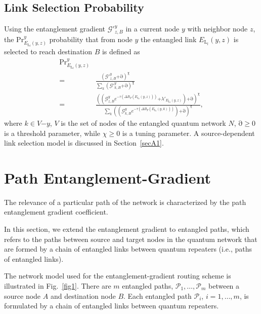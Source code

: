 \documentclass[11pt]{article}%
\newcommand{\fref}[1]{Fig.~\ref{#1}}
\newcommand{\sref}[1]{Section~\ref{#1}}
\begin{document}
\subsection{Link Selection Probability}
Using the entanglement gradient ${\mathcal{G}}'^y_{z,B}$ in a current node $y$ with neighbor node $z$, the $\mathrm{P}{\mathrm{r}}^y_{E_{{\mathrm{L}}_l}\left(y,z\right)}$ probability that from node $y$ the entangled link $E_{{\mathrm{L}}_l}\left(y,z\right)$ is selected to reach destination $B$ is defined as 
\begin{equation} \label{ZEqnNum536222} 
\begin{split}
\mathrm{P}{\mathrm{r}}^y_{E_{{\mathrm{L}}_l}\left(y,z\right)}\\\mathrm{=}&\frac{{\left({\mathcal{G}}'^y_{z,B}\mathrm{+}\mathrm{\partial }\right)}^{\chi }}{\sum_k{{\left({\mathcal{G}}'^y_{k,B}\mathrm{+}\mathrm{\partial }\right)}^{\chi }}}\\\mathrm{=}&\frac{{\left(\left({\mathcal{G}}^y_{z,B}e^{\mathrm{-}\tau \left(\mathit{\Delta}B_F\left(E_{{\mathrm{L}}_l}\left(y,z\right)\right)\right)}\mathrm{+}{\lambda }'_{E_{{\mathrm{L}}_l}\left(y,z\right)}\right)\mathrm{+}\mathrm{\partial }\right)}^{\chi }}{\sum_k{{\left(\left({\mathcal{G}}^y_{k,B}e^{\mathrm{-}\tau \left(\mathit{\Delta}B_F\left(E_{{\mathrm{L}}_l}\left(y,k\right)\right)\right)}\right)\mathrm{+}\mathrm{\partial }\right)}^{\chi }}},                                
\end{split}
\end{equation} 
where $k\mathrm{\in }V\mathrm{-}y$, $V$ is the set of nodes of the entangled quantum network $N$, $\mathrm{\partial }\mathrm{\ge }\mathrm{0}$ is a threshold parameter, while $\chi \mathrm{\ge }\mathrm{0}$ is a tuning parameter. A source-dependent link selection model is discussed in \sref{secA1}.

  
\section{Path Entanglement-Gradient}
\label{sec3}
 The relevance of a particular path of the network is characterized by the path entanglement gradient coefficient. 

 In this section, we extend the entanglement gradient to entangled paths, which refers to the paths between source and target nodes in the quantum network that are formed by a chain of entangled links between quantum repeaters (i.e., paths of entangled links).  

 The network model used for the entanglement-gradient routing scheme is illustrated in \fref{fig1}. There are $m$ entangled paths, ${\mathcal{P}}_{\mathrm{1}}\mathrm{,\dots ,}{\mathcal{P}}_m$  between a source node $A$ and destination node $B$. Each entangled path ${\mathcal{P}}_i$, $i\mathrm{=1,\dots ,}m$, is formulated by a chain of entangled links between quantum repeaters.
\end{document}
